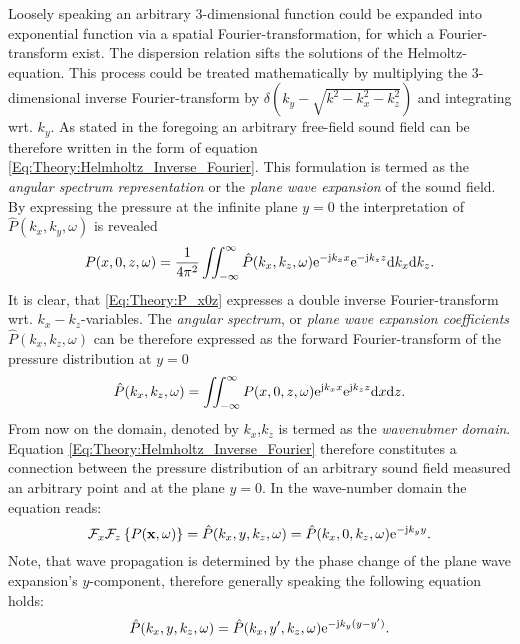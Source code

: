 Loosely speaking an arbitrary 3-dimensional function could be expanded into exponential function via a spatial Fourier-transformation, for which a Fourier-transform exist. The dispersion relation sifts the solutions of the Helmoltz-equation. This process could be treated mathematically by multiplying the 3-dimensional inverse Fourier-transform by $\delta(k_y - \sqrt{k^2-k_x^2-k_z^2})$ and integrating wrt. $k_y$.
As stated in the foregoing an arbitrary free-field sound field can be therefore written in the form of equation \eqref{Eq:Theory:Helmholtz_Inverse_Fourier}.
This formulation is termed as the \emph{angular spectrum representation} \cite{Ahrens2010phd, Ahrens2012, Williams1999} or the \emph{plane wave expansion} \cite{Spors2005} of the sound field.
By expressing the pressure at the infinite plane $y=0$ the interpretation of $\hat{P}(k_x,k_y, \omega)$ is revealed
\begin{equation}
P(x,0,z,\omega) = \frac{1}{4\pi^2}\iint_{-\infty}^{\infty} \hat{P}(k_x,k_z, \omega)  \mathrm{e}^{- \mathrm{j} k_x x} \mathrm{e}^{- \mathrm{j} k_z z  }
\mathrm{d} k_x\mathrm{d} k_z.
\label{Eq:Theory:P_x0z}
\end{equation}
It is clear, that \eqref{Eq:Theory:P_x0z} expresses a double inverse Fourier-transform wrt. $k_x-k_z$-variables. 
The \emph{angular spectrum}, or \emph{plane wave expansion coefficients} $\hat{P}(k_x,k_z, \omega)$ can be therefore expressed as the forward Fourier-transform of the pressure distribution at $y=0$
\begin{equation}
\hat{P}(k_x,k_z, \omega) = \iint_{-\infty}^{\infty} P(x,0,z,\omega)  \mathrm{e}^{ \mathrm{j} k_x x} \mathrm{e}^{ \mathrm{j} k_z z  }\mathrm{d} x \mathrm{d} z.
\end{equation}
From now on the domain, denoted by $k_x$,$k_z$ is termed as the \emph{wavenubmer domain}.
Equation \eqref{Eq:Theory:Helmholtz_Inverse_Fourier} therefore constitutes a connection between the pressure distribution of an arbitrary sound field measured an arbitrary point and at the plane $y=0$. In the wave-number domain the equation reads:
\begin{equation}
\mathcal{F}_x\mathcal{F}_z \left\{ P(\mathbf{x},\omega) \right\} = \hat{P}(k_x,y,k_z,\omega) = \hat{P}(k_x,0,k_z,\omega) \mathrm{e}^{-\mathrm{j} k_y y}.
\end{equation}
Note, that wave propagation is determined by the phase change of the plane wave expansion's $y$-component, therefore generally speaking the following equation holds:
\begin{equation}
\hat{P}(k_x,y,k_z,\omega) = \hat{P}(k_x,y',k_z,\omega) \mathrm{e}^{-\mathrm{j} k_y ( y - y' ) }.
\end{equation}

